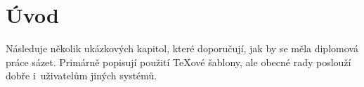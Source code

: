 \chapter*{Úvod}

Následuje několik ukázkových kapitol, které doporučují, jak by se
měla diplomová práce sázet. Primárně popisují použití \TeX{}ové
šablony, ale obecné rady poslouží dobře i~uživatelům jiných
systémů.

